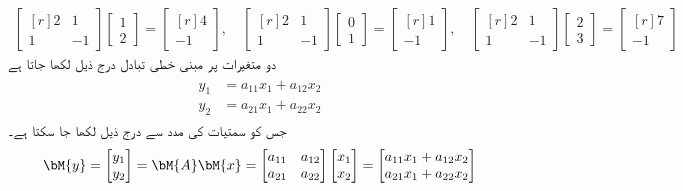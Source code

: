 \begin{align*}
\begin{bmatrix*}[r]
2&1\\
1&-1
\end{bmatrix*}
\begin{bmatrix*}
1\\
2
\end{bmatrix*}=
\begin{bmatrix*}[r]
4\\
-1
\end{bmatrix*}, \quad
\begin{bmatrix*}[r]
2&1\\
1&-1
\end{bmatrix*}
\begin{bmatrix*}
0\\
1
\end{bmatrix*}=
\begin{bmatrix*}[r]
1\\
-1
\end{bmatrix*},\quad
\begin{bmatrix*}[r]
2&1\\
1&-1
\end{bmatrix*}
\begin{bmatrix*}
2\\
3
\end{bmatrix*}=
\begin{bmatrix*}[r]
7\\
-1
\end{bmatrix*}
\end{align*}
دو متغیرات پر مبنی خطی تبادل درج ذیل لکھا جاتا ہے
\begin{gather}
\begin{aligned}\label{مساوات_الجبرا_خطی_تعلق_الف}
y_1&=a_{11}x_1+a_{12}x_2\\
y_2&=a_{21}x_1+a_{22}x_2
\end{aligned}
\end{gather}
جس کو سمتیات کی مدد سے درج ذیل لکھا جا سکتا ہے۔
\begin{align}\label{مساوات_الجبرا_خطی_تعلق_ب}
\bM{y}=\begin{bmatrix} y_1\\y_2 \end{bmatrix}=\bM{A}\bM{x}=\begin{bmatrix} a_{11}& a_{12}\\a_{21}&a_{22} \end{bmatrix}\begin{bmatrix} x_1\\ x_2 \end{bmatrix}=\begin{bmatrix} a_{11}x_1 + a_{12}x_2\\  a_{21}x_1 + a_{22}x_2\end{bmatrix}
\end{align}
